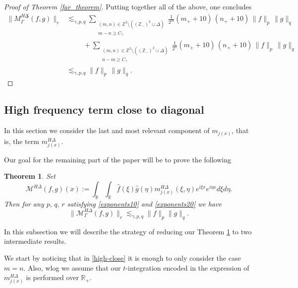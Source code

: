 \documentclass{amsart}
\newcommand{\R}{\mathbb{R}}
\newcommand{\Z}{\mathbb{Z}}
\newcommand{\g}{\gamma}
\newcommand{\M}{\mathcal{M}}
\newtheorem{theorem}{Theorem}[section]
\theoremstyle{definition}
\theoremstyle{remark}
\numberwithin{equation}{section}
\begin{document}
\begin{proof}[Proof of Theorem \ref{far_theorem}]
Putting together all of the above, one concludes
\begin{align*}
\|M_\Gamma^{H\not\Delta}(f,g)\|_r &\lesssim_{\gamma,p,q}
\sum_{\substack{(m,n)\in \Z^2\setminus((\Z_-)^2\cup\Delta)\\ m-n\geq C_{\g}}}
\frac{1}{2^m}(m_++10)\,(n_{+}+10)\,\|f\|_p\,\|g\|_q\\
&\hspace{1cm} +
\sum_{\substack{(m,n)\in \Z^2\setminus((\Z_-)^2\cup\Delta)\\ n-m\geq C_{\g}}}
\frac{1}{2^n}(m_++10)\,(n_{+}+10)\,\|f\|_p\,\|g\|_q\\
&\lesssim_{\gamma,p,q} \|f\|_p\,\|g\|_q.
\end{align*}
\end{proof}

\subsection{High frequency term close to diagonal}

In this section we consider the last and most relevant component of $m_{j(x)}$, that is, the term $m_{j(x)}^{H\Delta}$.

Our goal for the remaining part of the paper will be to prove the following

\begin{theorem}\label{high_frequency_diagonal theorem}
Set
 \begin{equation}\label{operator_close}
 \M^{H\Delta}(f,g)(x):=\int_\R \int_\R \hat{f}(\xi)\hat{g}(\eta)m_{j(x)}^{H\Delta}(\xi,\eta)e^{i\xi x}e^{i\eta
x}d\xi d\eta.
 \end{equation}
Then for any $p,\,q,\, r$ satisfying \eqref{exponents10} and \eqref{exponents20} we have
\begin{equation}\label{close_bound}
 \|\M_\Gamma^{H\Delta}(f,g)\|_r\lesssim_{\gamma,p,q}\|f\|_p\|g\|_{q}.
\end{equation}
\end{theorem}


In this subsection we will describe the strategy of reducing our Theorem \ref{high_frequency_diagonal theorem} to two intermediate results.

We start by noticing that in \eqref{high-close} it is enough to only consider the case $m=n.$ Also, wlog we assume that our $t$-integration encoded in the expression of $m_{j(x)}^{H\Delta}$ is performed over $\R_+$.
\end{document}
